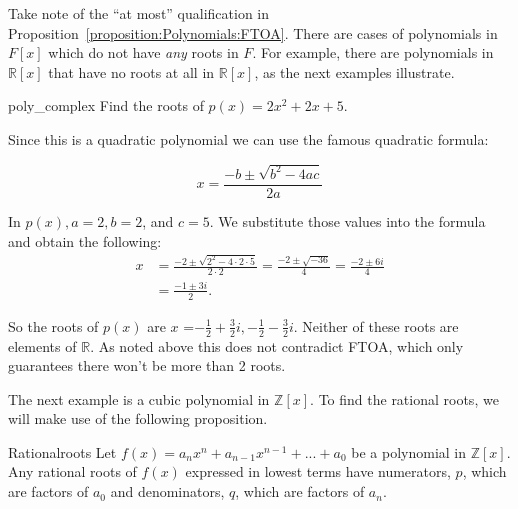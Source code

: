 Take note of the ``at most'' qualification in Proposition~\ref{proposition:Polynomials:FTOA}. There are cases of polynomials in $F[x]$ which do not have  \emph{any} roots in $F$. For example, there are polynomials in $\mathbb{R}[x]$ that have no roots at all in $\mathbb{R}[x]$, as the next examples illustrate.

\begin{example}{poly_complex} 
Find the roots of $p(x)=2x^2+2x+5$.

Since this is a quadratic polynomial we can use the famous quadratic formula:

$$x=\frac {-b \pm \sqrt{b^2-4ac}}{2a}$$

In $p(x), a=2, b=2$, and $c=5.$ We substitute those values into the formula and obtain the following:
\begin{align*}
x&=\frac {-2 \pm \sqrt{2^2-4\cdot 2\cdot 5}}{2\cdot 2}=\frac {-2 \pm \sqrt{-36}}{4}=\frac {-2 \pm 6i}{4}\\
&=\frac {-1 \pm 3i}{2}.
\end{align*}

So the roots of $p(x)$ are $x$ ={$-\frac{1}{2}+\frac{3}{2}i, -\frac{1}{2}-\frac{3}{2}i$}. Neither of these roots are elements of ${\mathbb R}$. As noted above this does not contradict FTOA, which only guarantees there won't be more than 2 roots.
\end{example}

The next example is a cubic polynomial in $\mathbb{Z}[x]$. To find the rational roots, we will make use of the following proposition.

\begin{prop}{Rationalroots}
Let $f(x) = a_{n}x^n+a_{n-1}x^{n-1}+...+a_{0}$ be a polynomial in $\mathbb{Z}[x]$. Any rational roots of $f(x)$ expressed in lowest terms have numerators, $p$, which are factors of $a_{0}$ and denominators, $q$, which are factors of $a_{n}$.
\end {prop}

